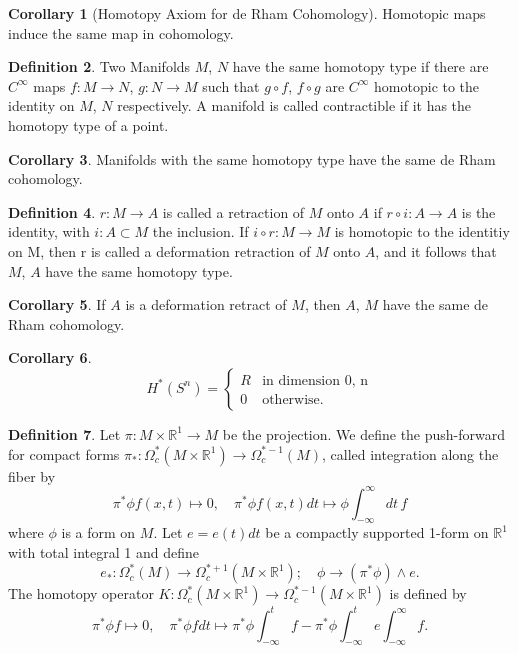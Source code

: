 \documentclass[twocolumn]{article}
\theoremstyle{definition}
\newtheorem{definition}{Definition}[section]
\newtheorem{corollary}[definition]{Corollary}
\theoremstyle{remark}
\begin{document}
\begin{corollary}[Homotopy Axiom for de Rham Cohomology]
    \label{homotopyAxiom}
    Homotopic maps induce the same map in cohomology.
\end{corollary}
\begin{definition}
    Two Manifolds $M$, $N$ have the same homotopy type if there are $C^\infty$ maps
    $f: M \rightarrow N$, $g: N \rightarrow M$ such that $g \circ f$, $f \circ g$ are $C^\infty$
    homotopic to the identity on $M$, $N$ respectively. A manifold is called contractible if it has the homotopy type of a point.
\end{definition}
\begin{corollary}
    Manifolds with the same homotopy type have the same de Rham cohomology.
\end{corollary}
\begin{definition}
    $r: M \rightarrow A$ is called a retraction of $M$ onto $A$ if $r \circ i: A \rightarrow A$ is the identity,
    with $i: A \subset M$ the inclusion. If $i \circ r: M \rightarrow M$ is homotopic to the identitiy on M,
    then r is called a deformation retraction of $M$ onto $A$, and it follows that $M$, $A$ have the same homotopy type.
\end{definition}
\begin{corollary}
    If $A$ is a deformation retract of $M$, then $A$, $M$ have the same de Rham cohomology.
\end{corollary}
\begin{corollary}
    \begin{equation}
        H^*(S^n) =
        \begin{cases}
            R & \textrm{in dimension 0, n}\\
            0 & \textrm{otherwise.}
        \end{cases}
    \end{equation}
\end{corollary}
\begin{definition}
    Let $\pi: M \times \mathbb{R}^1 \rightarrow M$ be the projection.
    We define the push-forward for compact forms $\pi_*: \Omega_c^*(M \times \mathbb{R}^1) \rightarrow \Omega^{*-1}_c(M)$, called integration along the fiber by
    \begin{equation}
        \pi^*\phi f(x, t) \mapsto 0, \quad \pi^*\phi f(x, t) dt \mapsto \phi \int^\infty_{-\infty} dt\,f
    \end{equation}
    where $\phi$ is a form on $M$. Let $e = e(t) dt$ be a compactly supported 1-form on $\mathbb{R}^1$ with total integral 1 and define
    \begin{equation}
        e_*: \Omega^*_c(M) \rightarrow \Omega^{*+1}_c(M\times \mathbb{R}^1); \quad \phi \rightarrow (\pi^*\phi) \wedge e.
    \end{equation}
    The homotopy operator $K: \Omega_c^*(M \times \mathbb{R}^1) \rightarrow\Omega_c^{*-1}(M \times \mathbb{R}^1)$ is defined by
    \begin{equation}
        \pi^*\phi f \mapsto 0, \quad \pi^*\phi f dt \mapsto \pi^*\phi \int^t_{-\infty} f - \pi^*\phi \int^t_{-\infty} e \int^\infty_{-\infty}f.
    \end{equation}
\end{definition}
\end{document}
